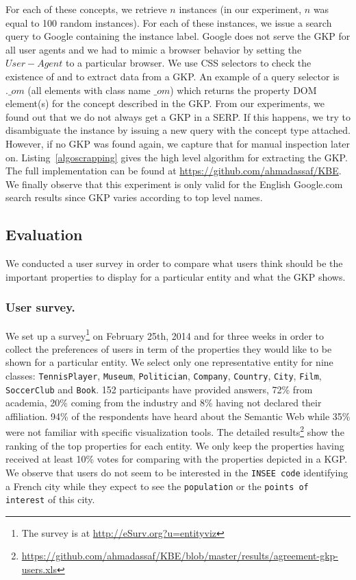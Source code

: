 For each of these concepts, we retrieve $n$ instances (in our experiment, $n$ was equal to 100 random instances). For each of these instances, we issue a search query to Google containing the instance label. Google does not serve the GKP for all user agents and we had to mimic a browser behavior by setting the $User-Agent$ to a particular browser. We use CSS selectors to check the existence of and to extract data from a GKP. An example of a query selector is $.\_om$ (all elements with class name $\_om$) which returns the property DOM element(s) for the concept described in the GKP. From our experiments, we found out that we do not always get a GKP in a SERP. If this happens, we try to disambiguate the instance by issuing a new query with the concept type attached. However, if no GKP was found again, we capture that for manual inspection later on. Listing~\ref{algoscrapping} gives the high level algorithm for extracting the GKP. The full implementation can be found at \url{https://github.com/ahmadassaf/KBE}. We finally observe that this experiment is only valid for the English Google.com search results since GKP varies according to top level names.


\subsection{Evaluation}
\label{sec:evaluation}
We conducted a user survey in order to compare what users think should be the important properties to display for a particular entity and what the GKP shows.

\subsubsection{User survey.}
\label{sec:survey}
We set up a survey\footnote{The survey is at \url{http://eSurv.org?u=entityviz}} on February 25th, 2014 and for three weeks in order to collect the preferences of users in term of the properties they would like to be shown for a particular entity. We select only one representative entity for nine classes: \texttt{TennisPlayer}, \texttt{Museum}, \texttt{Politician}, \texttt{Company}, \texttt{Country}, \texttt{City}, \texttt{Film}, \texttt{SoccerClub} and \texttt{Book}. 152 participants have provided answers, 72\% from academia, 20\% coming from the industry and 8\% having not declared their affiliation. 94\% of the respondents have heard about the Semantic Web while 35\% were not familiar with specific visualization tools. The detailed results\footnote{\url{https://github.com/ahmadassaf/KBE/blob/master/results/agreement-gkp-users.xls}} show the ranking of the top properties for each entity. We only keep the properties having received at least 10\% votes for comparing with the properties depicted in a KGP. We observe that users do not seem to be interested in the \texttt{INSEE code} identifying a French city while they expect to see the \texttt{population} or the \texttt{points of interest} of this city.

